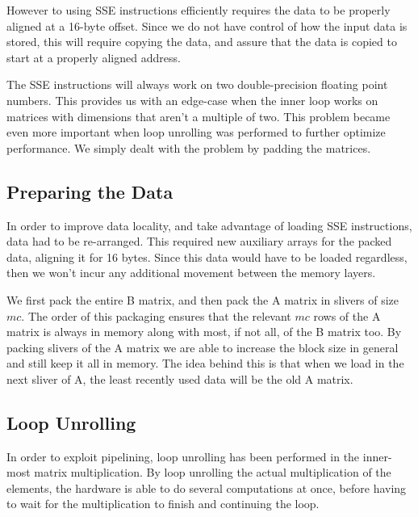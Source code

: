 \documentclass[a4paper,11pt,oneside]{book}
\begin{document}
However to using SSE instructions efficiently requires the data to be properly
aligned at a 16-byte offset. %
Since we do not have control of how the input data is stored, this will require 
copying the data, and assure that the data is copied to start at a properly 
aligned address. 

The SSE instructions will always work on two double-precision floating point
numbers. This provides us with an edge-case when the inner loop works on
matrices with dimensions that aren't a multiple of two. This problem became even
more important when loop unrolling was performed to further optimize
performance. We simply dealt with the problem by padding the matrices.


\subsection{Preparing the Data}

In order to improve data locality, and take advantage of loading SSE
instructions, data had to be re-arranged. This required new auxiliary arrays for
the packed data, aligning it for 16 bytes. Since this data would have to be
loaded regardless, then we won't incur any additional movement between the 
memory layers. %

We first pack the entire B matrix, and then pack the A matrix in slivers of size
$mc$. The order of this packaging ensures that the relevant $mc$ rows of the A
matrix is always in memory along with most, if not all, of the B matrix too. By
packing slivers of the A matrix we are able to increase the block size in
general and still keep it all in memory. The idea behind this is that when we
load in the next sliver of A, the least recently used data will be the old A
matrix. %

\subsection{Loop Unrolling}


In order to exploit pipelining, loop unrolling has been performed in the inner-
most matrix multiplication. By loop unrolling the actual multiplication of the
elements, the hardware is able to do several computations at once, before having
to wait for the multiplication to finish and continuing the loop.
\end{document}
